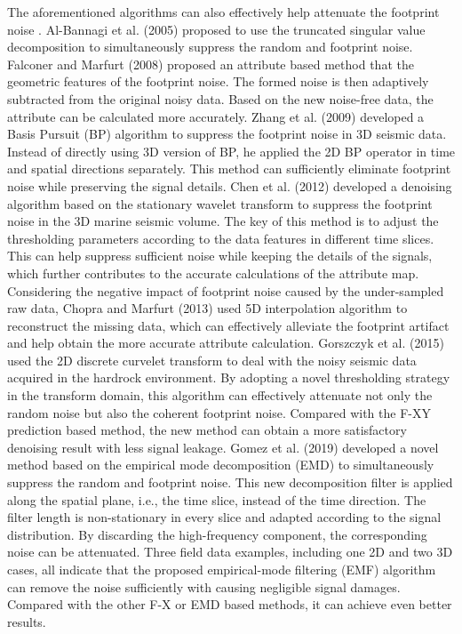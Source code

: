 The aforementioned algorithms can also effectively help attenuate the footprint noise \cite{Bannagi2005svd,Milos2007wt,Oswaldo2012ft,Abdulmohsen2016cwt}. Al-Bannagi et al. (2005) \cite{Muhammad2005tsvd} proposed to use the truncated singular value decomposition to simultaneously suppress the random and footprint noise. Falconer and Marfurt (2008) \cite{Scott2008ft} proposed an attribute based method that  the geometric features of the footprint noise. The formed noise is then adaptively subtracted from the original noisy data. Based on the new noise-free data, the attribute can be calculated more accurately. Zhang et al. (2009) \cite{Rui2009bpd} developed a Basis Pursuit (BP) algorithm to suppress the footprint noise in 3D seismic data. Instead of directly using 3D version of BP, he applied the 2D BP operator in time and spatial directions separately. This method can sufficiently eliminate footprint noise while preserving the signal details. Chen et al. (2012) \cite{Xuehua2012swt} developed a denoising algorithm based on the stationary wavelet transform to suppress the footprint noise in the 3D marine seismic volume. The key of this method is to adjust the thresholding parameters according to the data features in different time slices. This can help suppress sufficient noise while keeping the details of the signals, which further contributes to the accurate calculations of the attribute map. Considering the negative impact of footprint noise caused by the under-sampled raw data, Chopra and Marfurt (2013) \cite{Satinder2013interp} used  5D interpolation algorithm to reconstruct the missing data, which can effectively alleviate the footprint artifact and help obtain the more accurate attribute calculation. Gorszczyk et al. (2015) \cite{Gorszczyk2015curvelet} used the 2D discrete curvelet transform to deal with the noisy seismic data acquired in the hardrock environment. By adopting a novel thresholding strategy in the transform domain, this algorithm can effectively attenuate not only the random noise but also the coherent footprint noise. Compared with the F-XY prediction based method, the new method can obtain a more satisfactory denoising result with less signal leakage. Gomez et al. (2019) \cite{Gomez2019emd} developed a novel method based on the empirical mode decomposition (EMD) to simultaneously suppress the random and footprint noise. This new decomposition filter is applied along the spatial plane, i.e., the time slice, instead of the time direction. The filter length is non-stationary in every slice and adapted according to the signal distribution. By discarding the high-frequency component, the corresponding noise can be attenuated. Three field data examples, including one 2D and two 3D cases, all indicate that the proposed empirical-mode filtering (EMF) algorithm can remove the noise sufficiently with causing negligible signal damages. Compared with the other F-X or EMD based methods, it can achieve even better results. %